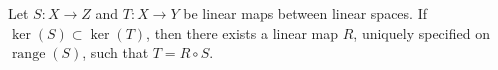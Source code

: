 Let $S : X \to Z$ and $T : X \to Y$ be linear maps between linear spaces. If $\ker(S) \subset \ker(T)$, then there exists a linear map $R$, uniquely specified on $\operatorname{range}(S)$, such that $T = R \circ S$.

